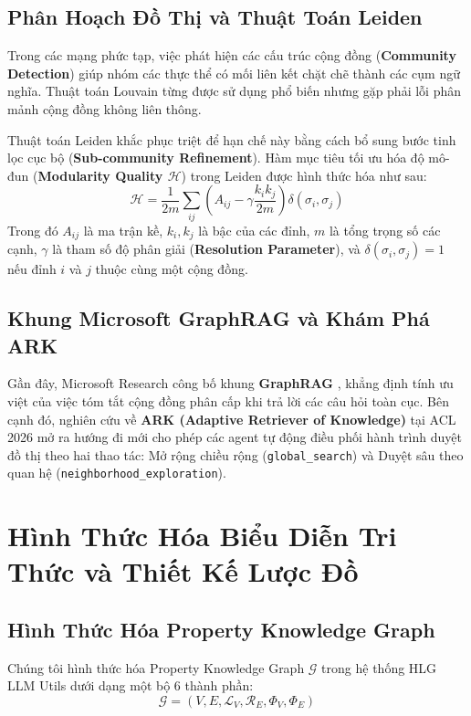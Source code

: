 \documentclass[11pt,a4paper]{report}
\begin{document}
\section{Phân Hoạch Đồ Thị và Thuật Toán Leiden}
Trong các mạng phức tạp, việc phát hiện các cấu trúc cộng đồng (\textbf{Community Detection}) giúp nhóm các thực thể có mối liên kết chặt chẽ thành các cụm ngữ nghĩa. Thuật toán Louvain từng được sử dụng phổ biến nhưng gặp phải lỗi phân mảnh cộng đồng không liên thông.

Thuật toán Leiden khắc phục triệt để hạn chế này bằng cách bổ sung bước tinh lọc cục bộ (\textbf{Sub-community Refinement}). Hàm mục tiêu tối ưu hóa độ mô-đun (\textbf{Modularity Quality $\mathcal{H}$}) trong Leiden được hình thức hóa như sau:
\begin{equation}
\mathcal{H} = \frac{1}{2m} \sum_{ij} \left( A_{ij} - \gamma \frac{k_i k_j}{2m} \right) \delta(\sigma_i, \sigma_j)
\end{equation}
Trong đó $A_{ij}$ là ma trận kề, $k_i, k_j$ là bậc của các đỉnh, $m$ là tổng trọng số các cạnh, $\gamma$ là tham số độ phân giải (\textbf{Resolution Parameter}), và $\delta(\sigma_i, \sigma_j) = 1$ nếu đỉnh $i$ và $j$ thuộc cùng một cộng đồng.

\section{Khung Microsoft GraphRAG và Khám Phá ARK}
Gần đây, Microsoft Research công bố khung \textbf{GraphRAG} \cite{edge2024graphrag}, khẳng định tính ưu việt của việc tóm tắt cộng đồng phân cấp khi trả lời các câu hỏi toàn cục. Bên cạnh đó, nghiên cứu về \textbf{ARK (Adaptive Retriever of Knowledge)} tại ACL 2026 \cite{polonuer2026ark} mở ra hướng đi mới cho phép các agent tự động điều phối hành trình duyệt đồ thị theo hai thao tác: Mở rộng chiều rộng (\texttt{global\_search}) và Duyệt sâu theo quan hệ (\texttt{neighborhood\_exploration}).

\chapter{Hình Thức Hóa Biểu Diễn Tri Thức và Thiết Kế Lược Đồ}

\section{Hình Thức Hóa Property Knowledge Graph}
Chúng tôi hình thức hóa Property Knowledge Graph $\mathcal{G}$ trong hệ thống HLG LLM Utils dưới dạng một bộ 6 thành phần:
\begin{equation}
\mathcal{G} = \left( V, E, \mathcal{L}_V, \mathcal{R}_E, \Phi_V, \Phi_E \right)
\end{equation}
\end{document}
